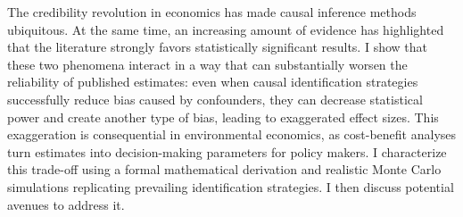 The credibility revolution in economics has made causal inference methods ubiquitous. At the same time, an increasing amount of evidence has highlighted that the literature strongly favors statistically significant results. I show that these two phenomena interact in a way that can substantially worsen the reliability of published estimates: even when causal identification strategies successfully reduce bias caused by confounders, they can decrease statistical power and create another type of bias, leading to exaggerated effect sizes. This exaggeration is consequential in environmental economics, as cost-benefit analyses turn estimates into decision-making parameters for policy makers. I characterize this trade-off using a formal mathematical derivation and realistic Monte Carlo simulations replicating prevailing identification strategies. I then discuss potential avenues to address it. 